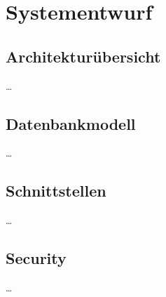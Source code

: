 \section{Systementwurf}
\subsection{Architekturübersicht}
\ldots
\subsection{Datenbankmodell}
\ldots
\subsection{Schnittstellen}
\ldots
\subsection{Security}
\ldots
